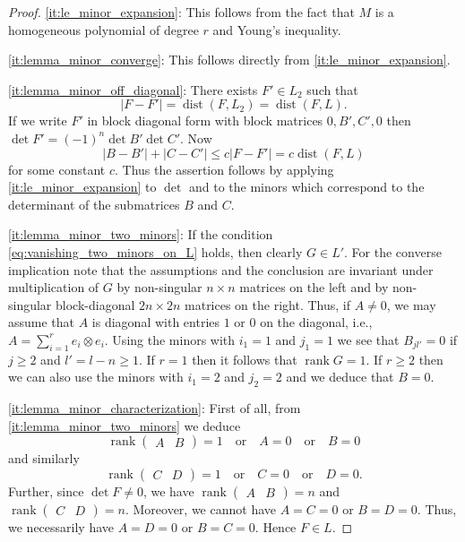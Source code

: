 \documentclass[titlepage]{amsart}
\numberwithin{equation}{section}
\theoremstyle{plain}
\theoremstyle{definition}
\theoremstyle{remark}
\newcommand{\dist}{\operatorname{dist}}
\newcommand{\rank}{\operatorname{rank}}
\begin{document}
\begin{proof} \eqref{it:le_minor_expansion}: This follows from the fact that $M$ is a homogeneous polynomial of degree $r$ and Young's inequality.

\eqref{it:lemma_minor_converge}: This follows directly from \eqref{it:le_minor_expansion}.

 \eqref{it:lemma_minor_off_diagonal}:  There exists $F' \in L_2$ such that 
 $$ |F- F'| = \dist(F, L_2) = \dist(F, L).$$
 If we write $F'$ in block diagonal form with block matrices $0, B', C', 0$
 then $\det F' = (-1)^n \det B' \det C'$. Now
 $$ |B - B'| + |C - C'| \le c |F-F'| = c \dist(F, L)$$
 for some constant $c$. Thus the assertion follows by applying    \eqref{it:le_minor_expansion} to $\det$ and
 to the minors which correspond to the determinant of the submatrices $B$ and $C$. 
 
  \eqref{it:lemma_minor_two_minors}:  If the condition  \eqref{eq:vanishing_two_minors_on_L} holds, then clearly $G \in L'$.
  For the converse implication note that
the assumptions and the conclusion are invariant under multiplication of $G$ by non-singular $n \times n$ matrices
on the left and by non-singular block-diagonal $2n \times 2n$ matrices on the right. 
Thus, if $A \ne 0$,  we may assume that $A$ is diagonal with entries $1$ or $0$ on the diagonal, i.e.,
 $A = \sum_{i=1}^r  e_i \otimes e_i$. Using the minors with $i_1=1$ and $j_1=1$ we see  that  $B_{jl'} = 0$ if $j \ge 2$
 and $l' = l-n \ge 1$.   If $r = 1$ then it follows that $\rank G = 1$. If $r \ge 2$ then we can also use the minors with
 $i_1=2$ and $j_2=2$ and we deduce that $B= 0$. 

 \eqref{it:lemma_minor_characterization}: First of all, from \eqref{it:lemma_minor_two_minors} we deduce 
$$ \rank \begin{pmatrix} A & B \end{pmatrix} = 1 \quad \text{or} \quad A = 0 \quad \text{or} \quad B=0$$
and similarly
$$ 
\rank \begin{pmatrix} C & D \end{pmatrix} = 1 \quad \text{or} \quad C = 0 \quad \text{or} \quad D=0.
$$
Further, since $\det F \ne 0$, we have $ \rank \begin{pmatrix} A & B \end{pmatrix} = n$ and
$ \rank \begin{pmatrix} C& D \end{pmatrix} = n$. Moreover, we cannot have $A=C=0$ or $B=D=0$.
Thus,  we necessarily have $A=D=0$ or $B=C=0$. Hence $F \in L$.
  \end{proof}
\end{document}
